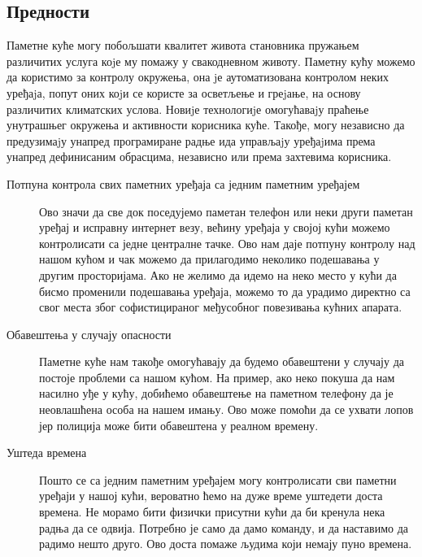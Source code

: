 \documentclass[a4paper]{article}
\begin{document}
\subsection{Предности}
Паметне куће могу побољшати квалитет живота становника пружањем различитих услуга коjе му помажу у свакодневном животу.\newline\newline
Паметну кућу можемо да користимо за контролу окружења, она jе аутоматизована контролом неких уређаjа, попут оних коjи се
користе за осветљење и греjање, на основу различитих климатских услова. Новиjе технологиjе омогућаваjу праћење унутрашњег
окружења и активности корисника куће. Такође, могу независно да предузимаjу унапред програмиране радње ида управљаjу уређаjима према унапред дефинисаним обрасцима, независно или према захтевима корисника.
\newline\newline
\begin{description}
    \item[Потпуна контрола свих паметних уређаја са једним паметним уређајем]
    Ово значи да све док поседујемо паметан телефон или неки други паметан уређај и исправну интернет везу, већину уређаја у својој кући можемо контролисати са једне централне тачке.
    Ово нам даје потпуну контролу над нашом кућом и чак можемо да прилагодимо неколико подешавања у другим просторијама. Ако не желимо да идемо на неко место
    у кући да бисмо променили подешавања уређаја, можемо то да урадимо директно са свог места због софистицираног међусобног повезивања кућних апарата.
    \item[Обавештења у случају опасности]
    Паметне куће нам такође омогућавају да будемо обавештени у случају да постоје проблеми са нашом кућом. На пример, ако неко покуша да нам насилно уђе у кућу,
    добићемо обавештење на паметном телефону да је неовлашћена особа на нашем имању. Ово може помоћи да се ухвати лопов јер полиција може бити обавештена у реалном времену.
    \item[Уштеда времена]
    Пошто се са једним паметним уређајем могу контролисати сви паметни уређаји у нашој кући, вероватно ћемо на дуже време уштедети доста времена. Не морамо бити
    физички присутни кући да би кренула нека радња да се одвија. Потребно је само да дамо команду, и да наставимо да радимо нешто друго.
    Ово доста помаже људима који немају пуно времена.
\end{description}
\end{document}
